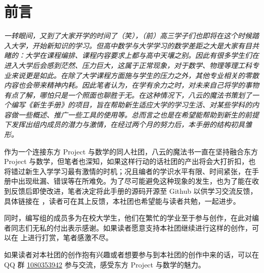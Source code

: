 \chapter*{前言}

\thispagestyle{empty}\itshape
一转眼间，又到了大家开学的时间了（笑），（前）高三学子们也即将在这个时候踏入大学，开始新知识的学习。但高中数学与大学学习的数学差距之大是大家有目共睹的：大学在课程编排、课程内容要求上都与高中天壤之别。因此有很多学生们在进入大学后会感到茫然、压力巨大，这属于正常现象，对于数学、物理等理工科专业来说更是如此。在除了大学课程方面施与学生的压力之外，其他专业相关的零散内容也会带来精神内耗。因此笔者认为，在学有余力之时，对未来自己将学的事物有点了解，哪怕只是一个照面也聊胜于无。在这种情况下，八云的魔法书策划了一个编写《新生手册》的项目，旨在帮助新生适应大学的学习生活、对某些学科的内容做一些概述、推广一些工具的使用等。总而言之也是在希望能帮助到新生的前提下发挥出组内成员的潜力与激情，在经过两个月的努力后，本手册的结构初具雏形。

作为一个连接东方 Project 与数学的同人社团，八云的魔法书一直在坚持融合东方 Project 与数学，但笔者也深知，如果这样行动的话社团的产出将会大打折扣，也将错过新生入学学习最有激情的时机；况且编者的学识水平有限、时间紧张，在手册中出现纰漏、错误等在所难免。为了尽可能避免这种现象的发生，也为了能在收到反馈后即使改进，笔者决定将此手册的源码开源至 Github 以供学习交流反馈，具体链接在 \link{\GitHubrepo}，读者可在其上反馈，本社团也希望能与读者共勉，一起进步。

同时，编写组的成员多为在校大学生，他们在繁忙的学业至于参与创作，在此对编者同志们无私的付出表示感谢。如果读者愿意支持本社团继续进行这样的创作，可以在  上进行打赏，笔者感激不尽。

如果读者对本社团的创作抱有兴趣或者想要参与到本社团的创作中来的话，可以在 QQ 群 \linebreak\href{https://jq.qq.com/?_wv=1027&k=7H6CQHKD}{1080353942} 参与交流，感受东方 Project 与数学的魅力。

\upshape
\bigskip
{}
